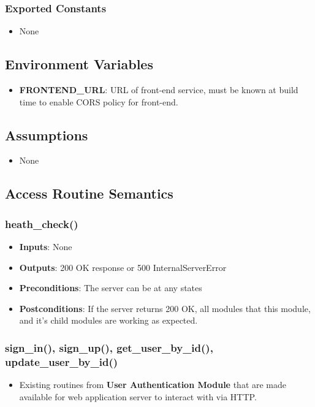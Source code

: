 \documentclass[12pt, titlepage]{article}
\begin{document}
\subsubsection{Exported Constants}
\begin{itemize}
    \item None
\end{itemize}

\subsection{Environment Variables}
\begin{itemize}
    \item \textbf{FRONTEND\_URL}: URL of front-end service, must be known at build time to enable CORS policy for front-end.
\end{itemize}

\subsection{Assumptions}
\begin{itemize}
    \item None
\end{itemize}

\subsection{Access Routine Semantics}

\subsubsection{heath\_check()}
\begin{itemize}
    \item \textbf{Inputs}: None
    \item \textbf{Outputs}: 200 OK response or 500 InternalServerError
    \item \textbf{Preconditions}: The server can be at any states
    \item \textbf{Postconditions}: If the server returns 200 OK, all modules that this module, and it's child modules are working as expected.
\end{itemize}

\subsubsection{sign\_in(), sign\_up(), get\_user\_by\_id(), update\_user\_by\_id()}
\begin{itemize}
    \item Existing routines from \textbf{User Authentication Module} that are made available for web application server to interact with via HTTP.
\end{itemize}
\end{document}

